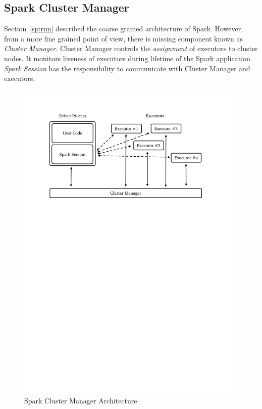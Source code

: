 \subsection{Spark Cluster Manager}
\label{sp:cluster}

Section~\ref{sp:run} described the coarse grained architecture of Spark. However, from a more fine grained point of view, there is missing component known as \emph{Cluster Manager}. Cluster Manager controls the \emph{assignment} of executors to cluster nodes. It monitors liveness of executors during lifetime of the Spark application. \emph{Spark Session} has the responsibility to communicate with Cluster Manager and executors.
\begin{figure}[h]
    \centering
    \includegraphics[clip,trim=2.4cm 19cm 3.5cm 2cm]{spark-cluster.pdf}
    \caption[Spark Cluster Manager Architecture]{Spark Cluster Manager Architecture\footnotemark}
    \label{fig:spark-cluster}
\end{figure}

